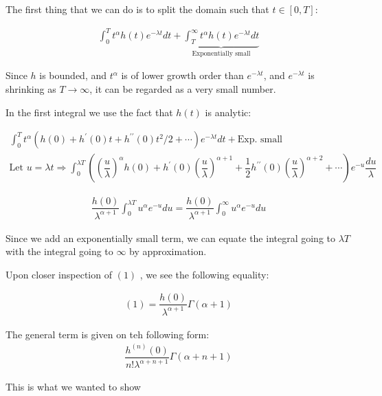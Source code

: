 \begin{prf}[]{}
  The first thing that we can do is to split the domain such that $t\in [0,T]$:\par
  \begin{equation*}
    \begin{gathered}
      \int_{0}^{T}t^\alpha h(t)e^{-\lambda t}dt +\underbrace{\int_{T}^{\infty}t^\alpha h(t)e^{-\lambda t}dt}_{\text{Exponentially small}} 
    \end{gathered}
  \end{equation*}
  \par\bigskip
  \noindent Since $h$ is bounded, and $t^\alpha$ is of lower growth order than $e^{-\lambda t}$, and $e^{-\lambda t}$ is shrinking as $T\to\infty$, it can be regarded as a very small number.
  \par\bigskip
  \noindent In the first integral we use the fact that $h(t)$ is analytic:\par
  \begin{equation*}
    \begin{gathered}
      \int_{0}^{T}t^{\alpha}\left(h(0)+h^{\prime}(0)t+h^{\prime\prime}(0)t^2/2+\cdots\right)e^{-\lambda t}dt + \text{Exp. small}\\
      \text{Let } u = \lambda t\Rightarrow \int_{0}^{\lambda T}\left(\left(\dfrac{u}{\lambda}\right)^\alpha h(0)+ h^{\prime}(0)\left(\dfrac{u}{\lambda}\right)^{\alpha+1}+\dfrac{1}{2}h^{\prime\prime}(0)\left(\dfrac{u}{\lambda}\right)^{\alpha+2}+\cdots\right) e^{-u}\dfrac{du}{\lambda}
    \end{gathered}
  \end{equation*}\par
  \begin{equation}
    \begin{gathered}
      \dfrac{h(0)}{\lambda^{\alpha+1}}\int_{0}^{\lambda T}u^{\alpha}e^{-u}du = \dfrac{h(0)}{\lambda^{\alpha+1}}\int_{0}^{\infty}u^{\alpha}e^{-u}du
    \end{gathered}
  \end{equation}
  \par\bigskip
  \noindent Since we add an exponentially small term, we can equate the integral going to $\lambda T$ with the integral going to $\infty$ by approximation.
  \par\bigskip
  \noindent Upon closer inspection of $(1)$ , we see the following equality:\par
  \begin{equation*}
    \begin{gathered}
      (1) = \dfrac{h(0)}{\lambda^{\alpha+1}}\Gamma(\alpha+1)
    \end{gathered}
  \end{equation*}
  \par\bigskip
  \noindent The general term is given on teh following form:
  \begin{equation*}
    \begin{gathered}
      \dfrac{h^{(n)}(0)}{n!\lambda^{\alpha+n+1}}\Gamma(\alpha+n+1)
    \end{gathered}
  \end{equation*}
  \par\bigskip
  \noindent This is what we wanted to show
\end{prf}
